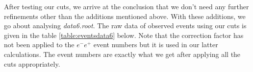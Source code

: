 After testing our cuts, we arrive at the conclusion that we don't need any further refinements other than the additions mentioned above. With these additions, we go about analysing \textit{data6.root}. The raw data of observed events using our cuts is given in the table \ref{table:eventsdata6} below. Note that the correction factor has not been applied to the $e^-e^+$ event numbers but it is used in our latter calculations. The event numbers are exactly what we get after applying all the cuts appropriately.

\begin{table}[!h]
\centering
{}
\caption{Number of events with different cuts applied to each of the MC data.}
\label{table:eventsdata6}
\end{table}

